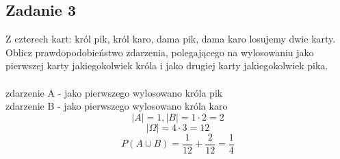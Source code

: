 \subsection{Zadanie 3}

Z czterech kart: król pik, król karo, dama pik, dama karo losujemy dwie karty. Oblicz prawdopodobieństwo zdarzenia, polegającego
na wylosowaniu jako pierwszej karty jakiegokolwiek króla i jako drugiej karty jakiegokolwiek pika. \\
\\
zdarzenie A - jako pierwszego wylosowano króla pik \\
zdarzenie B - jako pierwszego wylosowano króla karo \\
\[
|A| = 1 , |B| = 1 \cdot 2 = 2 
\]
\[
|\Omega| = 4 \cdot 3 = 12
\]
\[
P(A \cup B) = \frac{1}{12} + \frac{2}{12} = \frac{1}{4}
\]

